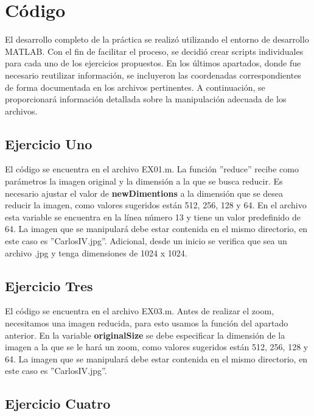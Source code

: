 \documentclass[
  journal=largetwo,
  manuscript=Practica-Dos,
  year=2024-1, %
  volume=37,
  spanish, %
]{cup-journal}
\begin{document}
\section{Código}

El desarrollo completo de la práctica se realizó utilizando el entorno de desarrollo MATLAB. Con el fin de facilitar el proceso, se decidió crear scripts individuales para cada uno de los ejercicios propuestos. En los últimos apartados, donde fue necesario reutilizar información, se incluyeron las coordenadas correspondientes de forma documentada en los archivos pertinentes. A continuación, se proporcionará información detallada sobre la manipulación adecuada de los archivos.

\subsection{Ejercicio Uno}

El código se encuentra en el archivo EX01.m. La función ''reduce'' recibe como parámetros la imagen original y la dimensión a la que se busca reducir. Es necesario ajustar el valor de \textbf{newDimentions} a la dimensión que se desea reducir la imagen, como valores sugeridos están 512, 256, 128 y 64. En el archivo esta variable se encuentra en la línea número 13 y tiene un valor predefinido de 64. La imagen que se manipulará debe estar contenida en el mismo directorio, en este caso es ''CarlosIV.jpg''. Adicional, desde un inicio se verifica que sea un archivo .jpg y tenga dimensiones de 1024 x 1024.

\subsection{Ejercicio Tres}

El código se encuentra en el archivo EX03.m. Antes de realizar el zoom, necesitamos una imagen reducida, para esto usamos la función del apartado anterior. En la variable \textbf{originalSize} se debe especificar la dimensión de la imagen a la que se le hará un zoom, como valores sugeridos están 512, 256, 128 y 64. La imagen que se manipulará debe estar contenida en el mismo directorio, en este caso es ''CarlosIV.jpg''.

\subsection{Ejercicio Cuatro}
\end{document}
